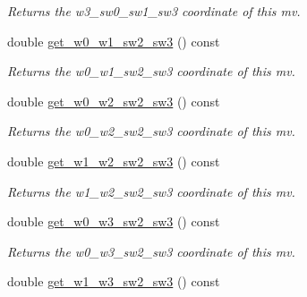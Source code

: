 \begin{DoxyCompactItemize}
\begin{DoxyCompactList}\small\item\em Returns the w3\-\_\-sw0\-\_\-sw1\-\_\-sw3 coordinate of this mv. \end{DoxyCompactList}\item 
\hypertarget{classe3ga_1_1mv_a7246d613b3cfb284ebbb8e8819e6094c}{double \hyperlink{classe3ga_1_1mv_a7246d613b3cfb284ebbb8e8819e6094c}{get\-\_\-w0\-\_\-w1\-\_\-sw2\-\_\-sw3} () const }\label{classe3ga_1_1mv_a7246d613b3cfb284ebbb8e8819e6094c}

\begin{DoxyCompactList}\small\item\em Returns the w0\-\_\-w1\-\_\-sw2\-\_\-sw3 coordinate of this mv. \end{DoxyCompactList}\item 
\hypertarget{classe3ga_1_1mv_aefa387ae5c137b4dc56db19efc91a3c5}{double \hyperlink{classe3ga_1_1mv_aefa387ae5c137b4dc56db19efc91a3c5}{get\-\_\-w0\-\_\-w2\-\_\-sw2\-\_\-sw3} () const }\label{classe3ga_1_1mv_aefa387ae5c137b4dc56db19efc91a3c5}

\begin{DoxyCompactList}\small\item\em Returns the w0\-\_\-w2\-\_\-sw2\-\_\-sw3 coordinate of this mv. \end{DoxyCompactList}\item 
\hypertarget{classe3ga_1_1mv_ae94ec6d91c3dcd837b4c440aeab742e8}{double \hyperlink{classe3ga_1_1mv_ae94ec6d91c3dcd837b4c440aeab742e8}{get\-\_\-w1\-\_\-w2\-\_\-sw2\-\_\-sw3} () const }\label{classe3ga_1_1mv_ae94ec6d91c3dcd837b4c440aeab742e8}

\begin{DoxyCompactList}\small\item\em Returns the w1\-\_\-w2\-\_\-sw2\-\_\-sw3 coordinate of this mv. \end{DoxyCompactList}\item 
\hypertarget{classe3ga_1_1mv_a99e90beb9a31955faccbbb2f1642e584}{double \hyperlink{classe3ga_1_1mv_a99e90beb9a31955faccbbb2f1642e584}{get\-\_\-w0\-\_\-w3\-\_\-sw2\-\_\-sw3} () const }\label{classe3ga_1_1mv_a99e90beb9a31955faccbbb2f1642e584}

\begin{DoxyCompactList}\small\item\em Returns the w0\-\_\-w3\-\_\-sw2\-\_\-sw3 coordinate of this mv. \end{DoxyCompactList}\item 
\hypertarget{classe3ga_1_1mv_a4fdac8afc2f8a819906d8b4ff249ea4e}{double \hyperlink{classe3ga_1_1mv_a4fdac8afc2f8a819906d8b4ff249ea4e}{get\-\_\-w1\-\_\-w3\-\_\-sw2\-\_\-sw3} () const }\label{classe3ga_1_1mv_a4fdac8afc2f8a819906d8b4ff249ea4e}


\end{DoxyCompactItemize}
